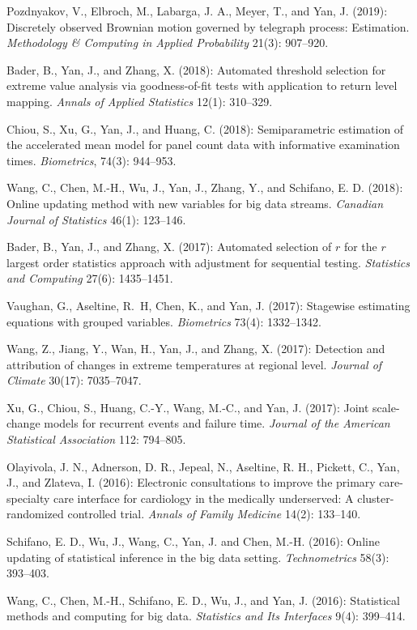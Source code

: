 \documentclass[Statistics]{vita}
\begin{document}
\begin{vita}
\begin{Publications}
\begin{RefereedJournalArticles}
  \item Pozdnyakov, V., Elbroch, M., Labarga, J. A., Meyer, T., and Yan, J. (2019): Discretely observed Brownian motion governed by telegraph process: Estimation. {\em Methodology \& Computing in Applied Probability\/} 21(3): 907--920.
  \item *Bader, B., Yan, J., and Zhang, X. (2018): Automated threshold selection for extreme value analysis via goodness-of-fit tests with application to return level mapping. {\em Annals of Applied Statistics\/} 12(1): 310--329.
  \item Chiou, S., Xu, G., Yan, J., and Huang, C. (2018): Semiparametric estimation of the accelerated mean model for panel count data with informative examination times. {\em Biometrics\/}, 74(3): 944--953.
  \item *Wang, C., Chen, M.-H., Wu, J., Yan, J., Zhang, Y., and Schifano, E. D. (2018): Online updating method with new variables for big data streams. {\em Canadian Journal of Statistics\/} 46(1): 123--146.
 \item *Bader, B., Yan, J., and Zhang, X. (2017): Automated selection of $r$ for the $r$ largest order statistics approach with adjustment for sequential testing. {\em Statistics and Computing\/} 27(6): 1435--1451.
  \item *Vaughan, G., Aseltine, R.~H, Chen, K., and Yan, J. (2017): Stagewise estimating equations with grouped variables. {\em Biometrics\/} 73(4): 1332--1342.
  \item *Wang, Z., Jiang, Y., Wan, H., Yan, J., and Zhang, X. (2017): Detection and attribution of changes in extreme temperatures at regional level.  {\em Journal of Climate\/} 30(17): 7035--7047.
  \item Xu, G., Chiou, S., Huang, C.-Y., Wang, M.-C., and Yan, J. (2017): Joint scale-change models for recurrent events and failure time. {\em Journal of the American Statistical Association\/} 112: 794--805.
  \item Olayivola, J. N., Adnerson, D. R., Jepeal, N., Aseltine, R. H., Pickett, C., Yan, J., and Zlateva, I. (2016): Electronic consultations to improve the primary care-specialty care interface for cardiology in the medically underserved: A cluster-randomized controlled trial. {\em Annals of Family Medicine\/} 14(2): 133--140.
  \item Schifano, E. D., Wu, J., Wang, C., Yan, J. and Chen, M.-H. (2016): Online updating of statistical inference in the big data setting. {\em Technometrics\/} 58(3): 393--403.
  \item *Wang, C., Chen, M.-H., Schifano, E. D., Wu, J., and Yan, J. (2016): Statistical methods and computing for big data. {\em Statistics and Its Interfaces\/} 9(4): 399--414.

\end{RefereedJournalArticles}
\end{Publications}
\end{vita}
\end{document}
